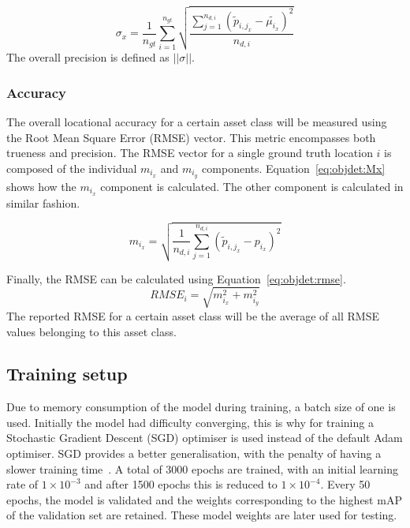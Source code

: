 \begin{equation}
    \sigma_x = \frac{1}{n_{gt}} \sum_{i=1}^{n_{gt}} \sqrt{\frac{\sum_{j=1}^{n_{d,i}} (\tilde{p}_{{i,j}_x} - \tilde{\mu_{i_x}})^2}{n_{d,i}}}
    \label{eq:objdet:precision}
\end{equation}
The overall precision is defined as $||\sigma||$.

\subsubsection{Accuracy} %
The overall locational accuracy for a certain asset class will be measured using the Root Mean Square Error (RMSE) vector. This metric encompasses both trueness and precision. The RMSE vector for a single ground truth location $i$ is composed of the individual $m_{i_x}$ and $m_{i_y}$ components. Equation~\ref{eq:objdet:Mx} shows how the $m_{i_x}$ component is calculated. The other component is calculated in similar fashion.

\begin{equation}
    m_{i_x} = \sqrt{\frac{1}{n_{d,i}} \sum_{j=1}^{n_{d,i}} (\tilde{p}_{{i,j}_x} - p_{i_x})^2}
    \label{eq:objdet:Mx}
\end{equation}

Finally, the RMSE can be calculated using Equation~\ref{eq:objdet:rmse}. 
\begin{equation}
    RMSE_i = \sqrt{m_{i_x}^2 + m_{i_y}^2}
    \label{eq:objdet:rmse}
\end{equation}
The reported RMSE for a certain asset class will be the average of all RMSE values belonging to this asset class.

\subsection{Training setup}
Due to memory consumption of the model during training, a batch size of one is used. Initially the model had difficulty converging, this is why for training a Stochastic Gradient Descent (SGD) optimiser is used instead of the default Adam optimiser. SGD provides a better generalisation, with the penalty of having a slower training time~\cite{ZhouPan20}. A total of 3000 epochs are trained, with an initial learning rate of $1\times 10^{-3}$ and after 1500 epochs this is reduced to $1\times 10^{-4}$. Every 50 epochs, the model is validated and the weights corresponding to the highest mAP of the validation set are retained. These model weights are later used for testing.  

